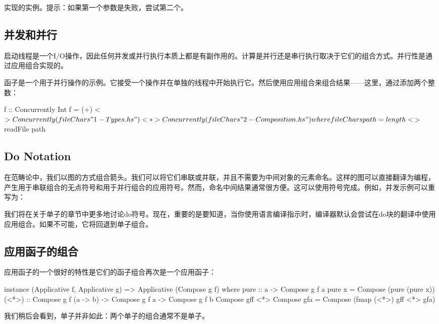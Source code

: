 \documentclass[DaoFP]{subfiles}
\begin{document}
\begin{exercise}
实现的实例。提示：如果第一个参数是失败，尝试第二个。
\end{exercise}

\subsection{并发和并行}

启动线程是一个I/O操作，因此任何并发或并行执行本质上都是有副作用的。计算是并行还是串行执行取决于它们的组合方式。并行性是通过应用组合实现的。

函子是一个用于并行操作的示例。它接受一个操作并在单独的线程中开始执行它。然后使用应用组合来组合结果——这里，通过添加两个整数：
\begin{haskell}
f :: Concurrently Int
f = (+) <$> Concurrently (fileChars "1-Types.hs") 
        <*> Concurrently (fileChars "2-Composition.hs")
    where fileChars path = length <$> readFile path
\end{haskell}

\subsection{Do Notation}
在范畴论中，我们以图的方式组合箭头。我们可以将它们串联或并联，并且不需要为中间对象的元素命名。这样的图可以直接翻译为编程，产生用于串联组合的无点符号和用于并行组合的应用符号。然而，命名中间结果通常很方便。这可以使用符号完成。例如，并发示例可以重写为：

我们将在关于单子的章节中更多地讨论do符号。现在，重要的是要知道，当你使用语言编译指示时，编译器默认会尝试在do块的翻译中使用应用组合。如果不可能，它将回退到单子组合。

\subsection{应用函子的组合}

应用函子的一个很好的特性是它们的函子组合再次是一个应用函子：
\begin{haskell}
instance (Applicative f, Applicative g) => 
  Applicative (Compose g f) where
    pure :: a -> Compose g f a
    pure x = Compose (pure (pure x))
    (<*>) :: Compose g f (a -> b) -> Compose g f a -> Compose g f b
    Compose gff <*> Compose gfa = Compose (fmap (<*>) gff <*> gfa)
\end{haskell}
我们稍后会看到，单子并非如此：两个单子的组合通常不是单子。
\end{document}
